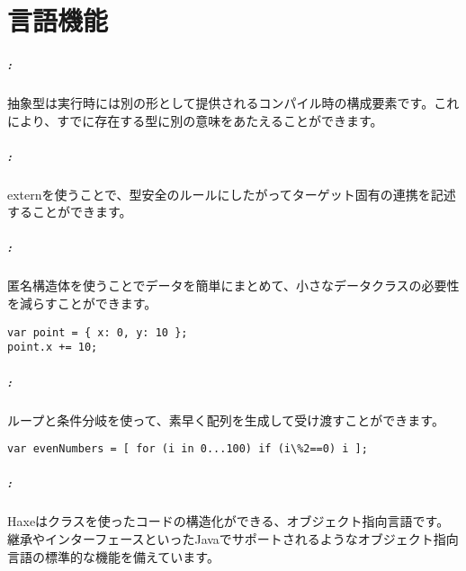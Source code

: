 \chapter{言語機能}
\label{lf}

\paragraph{:}

抽象型は実行時には別の形として提供されるコンパイル時の構成要素です。これにより、すでに存在する型に別の意味をあたえることができます。

\paragraph{:}

externを使うことで、型安全のルールにしたがってターゲット固有の連携を記述することができます。

\paragraph{:}

匿名構造体を使うことでデータを簡単にまとめて、小さなデータクラスの必要性を減らすことができます。

\begin{lstlisting}
var point = { x: 0, y: 10 };
point.x += 10;
\end{lstlisting}

\paragraph{:}

ループと条件分岐を使って、素早く配列を生成して受け渡すことができます。

\begin{lstlisting}
var evenNumbers = [ for (i in 0...100) if (i\%2==0) i ];
\end{lstlisting}

\paragraph{:}

Haxeはクラスを使ったコードの構造化ができる、オブジェクト指向言語です。継承やインターフェースといったJavaでサポートされるようなオブジェクト指向言語の標準的な機能を備えています。

